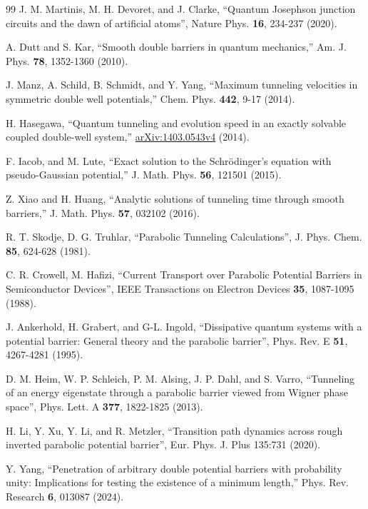 \documentclass{article}
\numberwithin{equation}{section}
\begin{document}
{\begin{thebibliography}{99}
 J. M. Martinis, M. H. Devoret, and J. Clarke, ``Quantum Josephson junction circuits and the dawn of artificial atoms'', Nature Phys. \textbf{16}, 234-237 (2020).

 A. Dutt and S. Kar, ``Smooth double barriers in quantum mechanics,'' Am. J. Phys. \textbf{78}, 1352-1360 (2010).

 J. Manz, A. Schild, B. Schmidt, and Y. Yang, ``Maximum tunneling velocities in symmetric double well potentials,'' Chem. Phys. \textbf{442}, 9-17 (2014).

 H. Hasegawa, ``Quantum tunneling and evolution speed in an exactly solvable coupled double-well system,'' \href{http://arxiv.org/abs/1403.0543v4}{arXiv:1403.0543v4} (2014).

 F. Iacob, and M. Lute, ``Exact solution to the Schr\"{o}dinger's equation with pseudo-Gaussian potential,'' J. Math. Phys. \textbf{56}, 121501 (2015).

 Z. Xiao and H. Huang, ``Analytic solutions of tunneling time through smooth barriers,''  J. Math. Phys. \textbf{57}, 032102 (2016).

 R. T. Skodje, D. G. Truhlar, ``Parabolic Tunneling Calculations'', J. Phys. Chem.  \textbf{85}, 624-628 (1981).

 C. R. Crowell, M. Hafizi, ``Current Transport over Parabolic Potential Barriers in
Semiconductor Devices'', IEEE Transactions on Electron Devices  \textbf{35}, 1087-1095 (1988).

 J. Ankerhold, H. Grabert, and G-L. Ingold, ``Dissipative quantum systems with a potential barrier: General theory and the parabolic barrier'', Phys. Rev. E  \textbf{51}, 4267-4281 (1995).

 D. M. Heim, W. P. Schleich, P. M. Alsing, J. P. Dahl, and S. Varro, ``Tunneling of an energy eigenstate through a parabolic barrier viewed from Wigner phase space'', Phys. Lett. A  \textbf{377}, 1822-1825 (2013).

 H. Li, Y. Xu, Y. Li, and R. Metzler, ``Transition path dynamics across rough inverted parabolic potential barrier'', Eur. Phys. J. Plus 135:731 (2020).

 Y. Yang, ``Penetration of arbitrary double potential barriers with probability unity:
Implications for testing the existence of a minimum length,'' Phys. Rev. Research \textbf{6}, 013087 (2024).


\end{thebibliography}}
\end{document}
